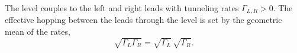 \documentclass{article}
\begin{document}
The level couples to the left and right leads with tunneling rates $\Gamma_{L,R}>0$. The
effective hopping between the leads through the level is set by the geometric mean of the rates,
\begin{equation}
\sqrt{\Gamma_L\Gamma_R} = \sqrt{\Gamma_L}\,\sqrt{\Gamma_R} .
\label{eq:geo}
\end{equation}
\end{document}
